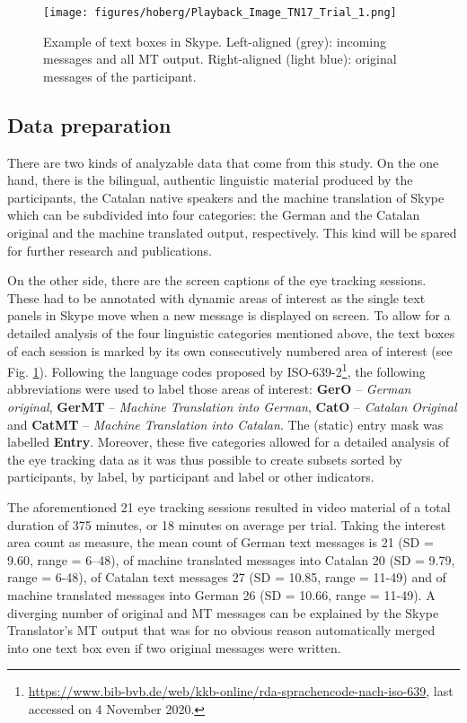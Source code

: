 \documentclass[output=paper,colorlinks,citecolor=brown]{langscibook}
\begin{document}
\begin{figure}
    \centering
    \texttt{[image: figures/hoberg/Playback\_Image\_TN17\_Trial\_1.png]}
    \caption{Example of text boxes in Skype. Left-aligned (grey): incoming messages and all MT output. Right-aligned (light blue): original messages of the participant.}
    \label{fig:textboxes}
\end{figure}


\subsection{Data preparation}
\label{subsec:dataprep}

There are two kinds of analyzable data that come from this study. On the one hand, there is the bilingual, authentic linguistic material produced by the participants, the Catalan native speakers and the machine translation of Skype which can be subdivided into four categories: the German and the Catalan original and the machine translated output, respectively. This kind will be spared for further research and publications.

On the other side, there are the screen captions of the eye tracking sessions. These had to be annotated with dynamic areas of interest as the single text panels in Skype move when a new message is displayed on screen. To allow for a detailed analysis of the four linguistic categories mentioned above, the text boxes of each session is marked by its own consecutively numbered area of interest (see Fig. \ref{fig:textboxes}). Following the language codes proposed by ISO-639-2\footnote{\url{https://www.bib-bvb.de/web/kkb-online/rda-sprachencode-nach-iso-639}, last accessed on 4 November 2020.}, the following abbreviations were used to label those areas of interest: \textbf{GerO} -- \textit{German original}, \textbf{GerMT} -- \textit{Machine Translation into German}, \textbf{CatO} -- \textit{Catalan Original} and \textbf{CatMT} -- \textit{Machine Translation into Catalan}. The (static) entry mask was labelled \textbf{Entry}. Moreover, these five categories allowed for a detailed analysis of the eye tracking data as it was thus possible to create subsets sorted by participants, by label, by participant and label or other indicators.

The aforementioned 21 eye tracking sessions resulted in video material of a total duration of 375 minutes, or 18 minutes on average per trial. Taking the interest area count as measure, the mean count of German text messages is 21 (SD = 9.60, range = 6--48), of machine translated messages into Catalan 20 (SD = 9.79, range = 6-48), of Catalan text messages 27 (SD = 10.85, range = 11-49) and of machine translated messages into German 26 (SD = 10.66, range = 11-49). A diverging number of original and MT messages can be explained by the Skype Translator's MT output that was for no obvious reason automatically merged into one text box even if two original messages were written.
\end{document}
